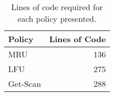\begin{table}
\centering
\caption{Lines of code required for each policy presented.}
\label{tab:loc-per-policy}
\begin{tabular}{lr}
\toprule
  Policy &  Lines of Code \\
\midrule
     MRU &            136 \\
     LFU &            275 \\
Get-Scan &            288 \\
\bottomrule
\end{tabular}
\end{table}
